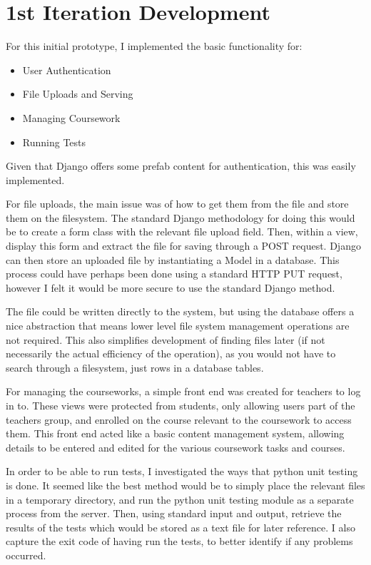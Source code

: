 \documentclass[a4paper,11pt]{report}
\begin{document}
\section{1st Iteration Development}
\label{sec:iter1dev}
For this initial prototype, I implemented the basic functionality for:
\begin{itemize}
\item User Authentication
\item File Uploads and Serving
\item Managing Coursework
\item Running Tests
\end{itemize}
Given that Django offers some prefab content for authentication, this was easily implemented.\par
For file uploads, the main issue was of how to get them from the file and store them on the filesystem. The standard Django methodology for doing this would be to create a form class with the relevant file upload field. Then, within a view, display this form and extract the file for saving through a POST request. Django can then store an uploaded file by instantiating a Model in a database. This process could have perhaps been done using a standard HTTP PUT request, however I felt it would be more secure to use the standard Django method.\par
The file could be written directly to the system, but using the database offers a nice abstraction that means lower level file system management operations are not required. This also simplifies development of finding files later (if not necessarily the actual efficiency of the operation), as you would not have to search through a filesystem, just rows in a database tables.\par
For managing the courseworks, a simple front end was created for teachers to log in to. These views were protected from students, only allowing users part of the teachers group, and enrolled on the course relevant to the coursework to access them. This front end acted like a basic content management system, allowing details to be entered and edited for the various coursework tasks and courses.\par
In order to be able to run tests, I investigated the ways that python unit testing is done. It seemed like the best method would be to simply place the relevant files in a temporary directory, and run the python unit testing module as a separate process from the server. Then, using standard input and output, retrieve the results of the tests which would be stored as a text file for later reference. I also capture the exit code of having run the tests, to better identify if any problems occurred.\par
\end{document}
